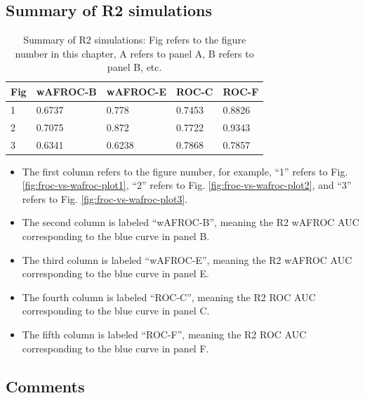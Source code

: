 \documentclass[
]{book}
\providecommand{\tightlist}{%
  \setlength{\itemsep}{0pt}\setlength{\parskip}{0pt}}
\begin{document}
\hypertarget{summary-of-r2-simulations}{%
\subsection{Summary of R2 simulations}\label{summary-of-r2-simulations}}

\begin{table}

\caption{\label{tab:froc-vs-wafroc-summary-table-rdr2}Summary of R2 simulations: Fig refers to the figure number in this chapter, A refers to panel A, B refers to panel B, etc.}
\centering
\begin{tabular}[t]{l|l|l|l|l}
\hline
Fig & wAFROC-B & wAFROC-E & ROC-C & ROC-F\\
\hline
1 & 0.6737 & 0.778 & 0.7453 & 0.8826\\
\hline
2 & 0.7075 & 0.872 & 0.7722 & 0.9343\\
\hline
3 & 0.6341 & 0.6238 & 0.7868 & 0.7857\\
\hline
\end{tabular}
\end{table}

\begin{itemize}
\tightlist
\item
  The first column refers to the figure number, for example, ``1'' refers to Fig. \ref{fig:froc-vs-wafroc-plot1}, ``2'' refers to Fig. \ref{fig:froc-vs-wafroc-plot2}, and ``3'' refers to Fig. \ref{fig:froc-vs-wafroc-plot3}.
\item
  The second column is labeled ``wAFROC-B'', meaning the R2 wAFROC AUC corresponding to the blue curve in panel B.
\item
  The third column is labeled ``wAFROC-E'', meaning the R2 wAFROC AUC corresponding to the blue curve in panel E.
\item
  The fourth column is labeled ``ROC-C'', meaning the R2 ROC AUC corresponding to the blue curve in panel C.
\item
  The fifth column is labeled ``ROC-F'', meaning the R2 ROC AUC corresponding to the blue curve in panel F.
\end{itemize}

\hypertarget{froc-vs-wafroc-comments}{%
\subsection{Comments}\label{froc-vs-wafroc-comments}}
\end{document}
